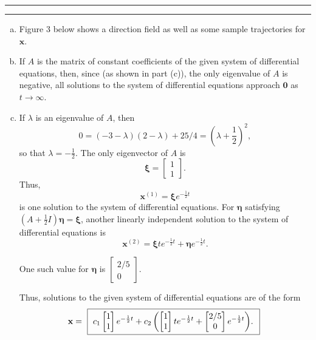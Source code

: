 \documentclass[11pt]{article}
\newcounter{questionCounter}
\newcounter{partCounter}[questionCounter]
\newenvironment{question}[2][\arabic{questionCounter}]{%
    \setcounter{partCounter}{0}%
    \vspace{.25in} \hrule \vspace{0.5em}%
        \noindent{\bf #2}%
    \vspace{0.8em} \hrule \vspace{.10in}%
    \addtocounter{questionCounter}{1}%
}{}
\newcommand{\bx}{\mathbf{x}}
\newcommand{\bzero}{\mathbf{0}}
\newcommand{\bxi}{\boldsymbol{\xi}}
\newcommand{\boldeta}{\boldsymbol{\eta}}
\begin{document}
\newpage
\begin{question}{Section 7.8, Problem 4}
\begin{enumerate}[(a)]
\item Figure 3 below shows a direction field as well as some sample
trajectories for $\bx$.
\vspace{2in}

\item If $A$ is the matrix of constant coefficients of the given system of
differential equations, then, since (as shown in part (c)), the only
eigenvalue of $A$ is negative, all solutions to the system of differential
equations approach $\bzero$ as $t \rightarrow \infty$.

\item If $\lambda$ is an eigenvalue of $A$, then
\[0
 = (-3 - \lambda)(2 - \lambda) + 25/4
 = \left(\lambda + \frac12\right)^2,
\]
so that $\lambda = -\frac12$. The only eigenvector of $A$ is
\[\bxi
 = \begin{bmatrix}
        1     \\
        1
   \end{bmatrix}.
\]
Thus,
\[\bx^{(1)} = \bxi e^{-\frac12t}\]
is one solution to the system of differential equations. For $\boldeta$
satisfying $(A + \frac12I)\boldeta = \bxi$, another linearly independent
solution to the system of differential equations is
\[\bx^{(2)} = \bxi te^{-\frac12t} + \boldeta e^{-\frac12t}.\]

One such value for $\boldeta$ is $\begin{bmatrix} 2/5 \\ 0 \end{bmatrix}$.

Thus, solutions to the given system of differential equations are of the form
\[\bx
 = \mbox{
    \fbox{
        $\displaystyle
            c_1\begin{bmatrix} 1 \\ 1 \end{bmatrix}e^{-\frac12t}
            + c_2\left(
                \begin{bmatrix} 1 \\ 1 \end{bmatrix}te^{-\frac12t}
                + \begin{bmatrix} 2/5 \\ 0 \end{bmatrix} e^{-\frac12t}
            \right)
        $.
    }
   }
\]

\end{enumerate}
\end{question}
\end{document}
